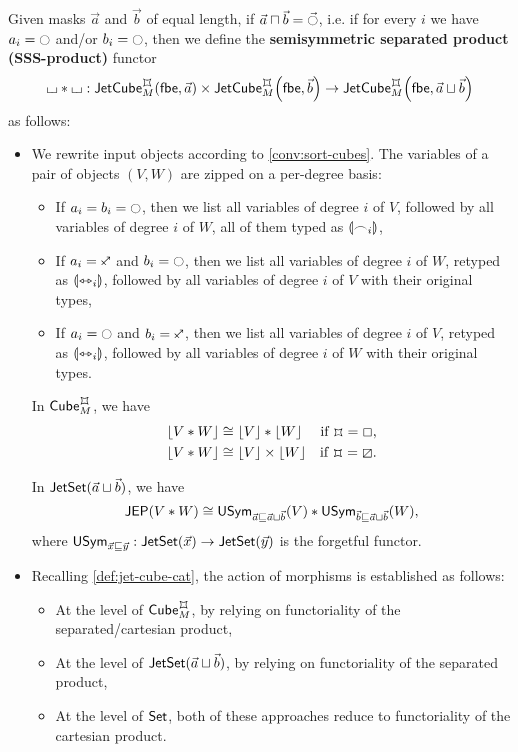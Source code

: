 \documentclass[a4paper]{memoir}
\begin{document}
\begin{definition} \label{def:sssprod}
	Given masks $\vec a$ and $\vec b$ of equal length, if $\vec a \sqcap \vec b = \vec \npolar$, i.e. if for every $i$ we have $a_i = \npolar$ and/or $b_i = \npolar$, then we define the \textbf{semisymmetric separated product (SSS-product)} functor
	\[
		\loch * \loch : \jetcubetri \mycubex M {\vec a} \times \jetcubetri \mycubex M {\vec b} \to \jetcubetri \mycubex M {\vec a \sqcup \vec b}
	\]
	as follows:
	\begin{itemize}
		\item We rewrite input objects according to \cref{conv:sort-cubes}.
		The variables of a pair of objects $(V, W)$ are zipped on a per-degree basis:
		\begin{itemize}
			\item If $a_i = b_i = \npolar$, then we list all variables of degree $i$ of $V$, followed by all variables of degree $i$ of $W$, all of them typed as ${\llparenthesis \frown_i \rrparenthesis}$,
			\item If $a_i = \ypolar$ and $b_i = \npolar$, then we list all variables of degree $i$ of $W$, retyped as ${\llparenthesis \leftrightarrowtriangle_i \rrparenthesis}$, followed by all variables of degree $i$ of $V$ with their original types,
			\item If $a_i = \npolar$ and $b_i = \ypolar$, then we list all variables of degree $i$ of $V$, retyped as ${\llparenthesis \leftrightarrowtriangle_i \rrparenthesis}$, followed by all variables of degree $i$ of $W$ with their original types.
		\end{itemize}
		\begin{corollary} \label{thm:erase-sssprod}
			In $\cubecat_M^\mycubex$, we have
			\begin{align*}
				\erasejc{V * W} &\cong \erasejc V * \erasejc W &\text{if $\mycubex = \affine$,} \\
				\erasejc{V * W} &\cong \erasejc V \times \erasejc W &\text{if $\mycubex = \cartes$.}
			\end{align*}
		\end{corollary}
		\begin{corollary}
			In $\mathsf{JetSet}(\vec a \sqcup \vec b)$, we have
			\[
				\mathsf{JEP}(V * W) \cong \mathsf{USym}_{\vec a \sqsubseteq \vec a \sqcup \vec b}(V) * \mathsf{USym}_{\vec b \sqsubseteq \vec a \sqcup \vec b}(W),
			\]
			where $\mathsf{USym}_{\vec x \sqsubseteq \vec y} : \mathsf{JetSet}(\vec x) \to \mathsf{JetSet}(\vec y)$ is the forgetful functor.
		\end{corollary}
		\item Recalling \cref{def:jet-cube-cat}, the action of morphisms is established as follows:
		\begin{itemize}
			\item At the level of $\cubecat_M^\mycubex$, by relying on functoriality of the separated/cartesian product,
			\item At the level of $\mathsf{JetSet}(\vec a \sqcup \vec b)$, by relying on functoriality of the separated product,
			\item At the level of ${\mathsf{Set}}$, both of these approaches reduce to functoriality of the cartesian product.
		\end{itemize}
	\end{itemize}
\end{definition}
\end{document}
